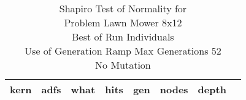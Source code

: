\begin{table}[H]
\caption{Shapiro Test of Normality for \\ Problem  Lawn Mower 8x12\\Best of Run Individuals \\ Use of Generation Ramp  Max Generations 52\\ No Mutation \\}
\begin{center}
\scalebox{0.8} %
{
\begin{tabular}{lrrrrrrr}
\hline
kern & adfs & what & hits & gen & nodes & depth \\
\hline


\end{tabular}
}
\end{center}
\end{table}

